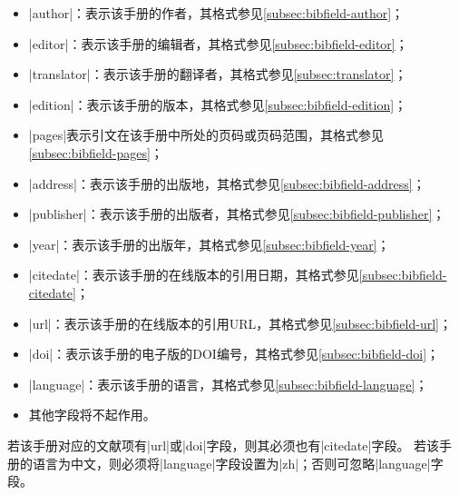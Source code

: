 \begin{itemize}
\item |author|：表示该手册的作者，其格式参见\ref{subsec:bibfield-author}；
\item |editor|：表示该手册的编辑者，其格式参见\ref{subsec:bibfield-editor}；
\item |translator|：表示该手册的翻译者，其格式参见\ref{subsec:translator}；
\item |edition|：表示该手册的版本，其格式参见\ref{subsec:bibfield-edition}；
\item |pages|表示引文在该手册中所处的页码或页码范围，其格式参见\ref{subsec:bibfield-pages}；
\item |address|：表示该手册的出版地，其格式参见\ref{subsec:bibfield-address}；
\item |publisher|：表示该手册的出版者，其格式参见\ref{subsec:bibfield-publisher}；
\item |year|：表示该手册的出版年，其格式参见\ref{subsec:bibfield-year}；
\item |citedate|：表示该手册的在线版本的引用日期，其格式参见\ref{subsec:bibfield-citedate}；
\item |url|：表示该手册的在线版本的引用URL，其格式参见\ref{subsec:bibfield-url}；
\item |doi|：表示该手册的电子版的DOI编号，其格式参见\ref{subsec:bibfield-doi}；
\item |language|：表示该手册的语言，其格式参见\ref{subsec:bibfield-language}；
\item 其他字段将不起作用。
\end{itemize}


\begin{note}
若该手册对应的文献项有|url|或|doi|字段，则其必须也有|citedate|字段。
若该手册的语言为中文，则必须将|language|字段设置为|zh|；否则可忽略|language|字段。
\end{note}